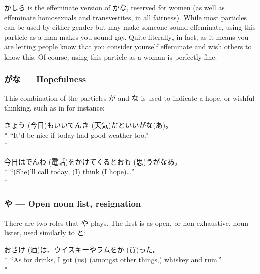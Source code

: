 \documentclass[11pt, b5paper, twoside, openright, onecolumn]{book}
\makeatletter
\newcommand*{\rubystack}[2]{{\relscale{0.5}%
  \begin{tabular}[b]{@{}c@{}}%
    {#1}\\%
   {\textscale{2}{#2}}%
  \end{tabular}}%
}
\DeclareRobustCommand*{\ruby}[2]{%
  \mbox{%
    \setlength{\parskip}{0ex}%
    \BeginAccSupp{method=pdfstringdef,ActualText={#1}}%
      \rubystack{\phantom{#2}}{#1}%
      \llap{%
        \rubystack{#2}{\phantom{#1}}%
      }%
    \EndAccSupp{}%
  }%
}
\renewcommand*{\ruby}[2]{#2 (#1)}%
\newenvironment{exampleblock}{
\setlength{\parindent}{0.6in}
\begin{minipage}[t]{\dimexpr\textwidth-\parindent}}
{\end{minipage}}
\makeatother
\begin{document}
かしら is the effeminate version of かな‚ reserved for women (as well as effeminate homosexuals and transvestites‚ in all fairness). While most particles can be used by either gender but may make someone sound effeminate‚ using this particle as a man makes you sound gay. Quite literally‚ in fact‚ as it means you are letting people know that you consider yourself effeminate and wish others to know this. Of course‚ using this particle as a woman is perfectly fine.

\subsubsection{がな — Hopefulness}

This combination of the particles が and な is used to indicate a hope‚ or wishful thinking‚ such as in for instance:

\vspace{0.4cm}
\begin{exampleblock}
\ruby{今日}{きょう}もいい\ruby{天気}{てんき}だといいがな(あ)。 \\* 
“It’d be nice if today had good weather too.” \\* 
\end{exampleblock}
\vspace{0.2cm}

\begin{exampleblock}
今日は\ruby{電話}{でんわ}をかけてくると\ruby{思}{おも}うがなあ。 \\* 
“(She)’ll call today‚ (I) think (I hope)…” \\* 
\end{exampleblock}
\subsubsection{や — Open noun list‚ resignation}


There are two roles that や plays. The first is as open‚ or non-exhaustive‚ noun lister‚ used similarly to と:

\vspace{0.4cm}
\begin{exampleblock}
お\ruby{酒}{さけ}は、ウイスキーやラムを\ruby{買}{か}った。 \\* 
“As for drinks‚ I got (us) (amongst other things‚) whiskey and rum.” \\* 
\end{exampleblock}
\vspace{0.2cm}
\end{document}
